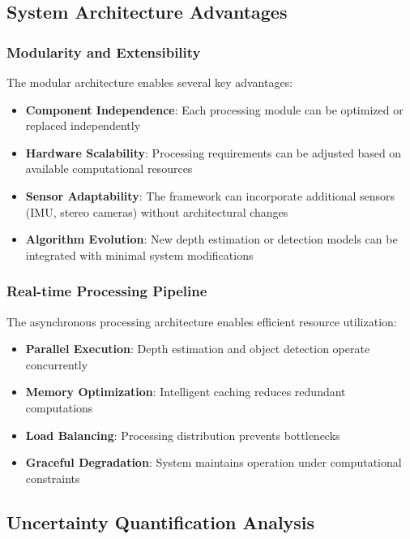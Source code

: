 \documentclass[10pt]{article}
\begin{document}
\subsection{System Architecture Advantages}

\subsubsection{Modularity and Extensibility}

The modular architecture enables several key advantages:

\begin{itemize}
\item \textbf{Component Independence}: Each processing module can be optimized or replaced independently
\item \textbf{Hardware Scalability}: Processing requirements can be adjusted based on available computational resources
\item \textbf{Sensor Adaptability}: The framework can incorporate additional sensors (IMU, stereo cameras) without architectural changes
\item \textbf{Algorithm Evolution}: New depth estimation or detection models can be integrated with minimal system modifications
\end{itemize}

\subsubsection{Real-time Processing Pipeline}

The asynchronous processing architecture enables efficient resource utilization:

\begin{itemize}
\item \textbf{Parallel Execution}: Depth estimation and object detection operate concurrently
\item \textbf{Memory Optimization}: Intelligent caching reduces redundant computations
\item \textbf{Load Balancing}: Processing distribution prevents bottlenecks
\item \textbf{Graceful Degradation}: System maintains operation under computational constraints
\end{itemize}

\subsection{Uncertainty Quantification Analysis}
\end{document}
